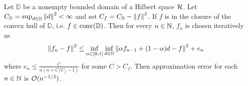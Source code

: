 \begin{theorem}
    Let $\mathbb{D}$ be a nonempty bounded domain of a Hilbert space $\mathcal{H}$.
    Let $C_{\mathbb{D}} = \sup_{d \in \mathbb{D}} \left\| d \right\|^2 < \infty$ and set
    $C_f = C_{\mathbb{D}} - \left\| f \right\|^2$. If $f$ is in the closure of the convex
    hull of $\mathbb{D}$, i.e. $f \in \operatorname*{conv}(\mathbb{D})$. Then for every $n \in
    \mathbb{N}$, $f_n$ is chosen iteratively as
    \begin{equation}
        \left\| f_n - f \right\|^2 \leq \inf_{\alpha \in [0,1]} \inf_{d \in \mathbb{D}}
        \left\| \alpha f_{n-1} + (1-\alpha)d - f \right\|^2 + e_n
    \end{equation}
    where $e_n \leq \frac{C}{n(n+C/C_f -1 )}$ for some $C > C_f$. Then
    approximation error for each $n \in \mathbb{N}$ is $\mathcal{O}(n^{-1/2})$.
\end{theorem}

